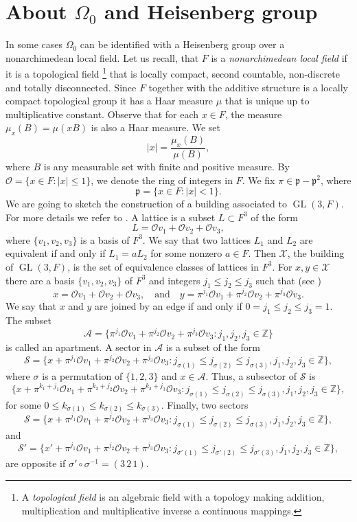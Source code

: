 \documentclass[a4paper]{amsart}
\newcommand{\abs}[1]{{\lvert {#1} \rvert}}
\newcommand{\GL}{\operatorname{GL}}
\newcommand{\ZZ}{\mathbb{Z}}
\newcommand{\calS}{\mathcal{S}}
\newcommand{\calO}{\mathcal{O}}
\theoremstyle{plain}
\theoremstyle{definition}
\theoremstyle{remark}
\numberwithin{equation}{section}
\theoremstyle{plain}
\begin{document}
\appendix
\section{About $\Omega_0$ and Heisenberg group}
\label{ap:1}
	In some cases $\Omega_0$ can be identified with a Heisenberg group over a nonarchimedean local field. Let
	us recall, that $F$ is a \emph{nonarchimedean local field} if it is a topological field
	\footnote{A \emph{topological field} is an algebraic field with a topology making addition, multiplication and
	multiplicative inverse a continuous mappings.} that is locally compact, second
	countable, non-discrete and totally disconnected. Since $F$ together with the additive structure is a locally compact
	topological group it has a Haar measure $\mu$ that is unique up to multiplicative constant. Observe that for each
	$x \in F$, the measure $\mu_x(B) =  \mu(x B)$ is also a Haar measure. We set
	\[
		\abs{x} = \frac{\mu_x(B)}{\mu(B)},
	\]
	where $B$ is any measurable set with finite and positive measure.
	By $\calO = \{x \in F : \abs{x} \leq 1\}$, we denote the ring of integers in $F$. We fix $\pi \in \mathfrak{p} -
	\mathfrak{p}^2$, where
	\[
		\mathfrak{p} = \big\{x \in F : \abs{x} < 1\big\}.
	\]
	We are going to sketch the construction of a building associated to $\GL(3, F)$. For more details we refer
	to \cite{st-b}. A lattice is a subset $L \subset F^3$ of the form
	\[
		L = \calO v_1 + \calO v_2 + \calO v_3,
	\]
	where $\{v_1, v_2, v_3\}$ is a basis of $F^3$.
	We say that two lattices $L_1$ and $L_2$ are equivalent if and only if $L_1 = a L_2$ for some nonzero
	$a \in F$. Then $\mathscr{X}$, the building of $\GL(3, F)$, is the set of equivalence
	classes of lattices in $F^3$. For $x, y \in \mathscr{X}$ there are a basis $\{v_1, v_2, v_3\}$
	of $F^3$ and integers $j_1 \leq j_2 \leq j_3$ such that (see \cite[Proposition 3.1]{st-b})
	\[
		x = \calO v_1 + \calO v_2 + \calO v_3, \quad\text{and}\quad
		y = \pi^{j_1} \calO v_1 + \pi^{j_2} \calO v_2 + \pi^{j_3} \calO v_3.
	\]
	We say that $x$ and $y$ are joined by an edge if and only if $0 = j_1 \leq j_2 \leq j_3 = 1$. The subset
	\[
		\mathscr{A} =
		\big\{\pi^{j_1} \calO v_1 + \pi^{j_2} \calO v_2 + \pi^{j_3} \calO v_3 : j_1, j_2, j_3 \in \ZZ \big\}
	\]
	is called an apartment. A sector in $\mathscr{A}$ is a subset of the form
	\[
		\calS = \big\{x + \pi^{j_1} \calO v_1 + \pi^{j_2} \calO v_2 + \pi^{j_3} \calO v_3 : 
		j_{\sigma(1)}\leq j_{\sigma(2)} \leq j_{\sigma(3)}, j_1, j_2, j_3 \in \ZZ \big\},
	\]
	where $\sigma$ is a permutation of $\{1, 2, 3\}$ and $x \in \mathscr{A}$. Thus, a subsector of $\calS$ is
    \[
        \big\{x + \pi^{k_1+j_1} \calO v_1 + \pi^{k_2+j_2} \calO v_2 + \pi^{k_3+ j_3} \calO v_3 : j_{\sigma(1)} 
		\leq j_{\sigma(2)} \leq j_{\sigma(3)},
        j_1, j_2, j_3 \in \ZZ\},
    \]
	for some $0 \leq k_{\sigma(1)} \leq k_{\sigma(2)} \leq k_{\sigma(3)}$. Finally, two sectors
	\[
		\calS = \big\{x + \pi^{j_1} \calO v_1 + \pi^{j_2} \calO v_2 + \pi^{j_3} \calO v_3 :
        j_{\sigma(1)}\leq j_{\sigma(2)} \leq j_{\sigma(3)}, j_1, j_2, j_3 \in \ZZ \big\},
	\]
	and
	\[
		\calS' = \big\{x' + \pi^{j_1} \calO v_1 + \pi^{j_2} \calO v_2 + \pi^{j_3} \calO v_3 :
        j_{\sigma'(1)}\leq j_{\sigma'(2)} \leq j_{\sigma'(3)}, j_1, j_2, j_3 \in \ZZ \big\},
	\]
	are opposite if $\sigma' \circ \sigma^{-1} = (3\, 2\, 1)$.
\end{document}

